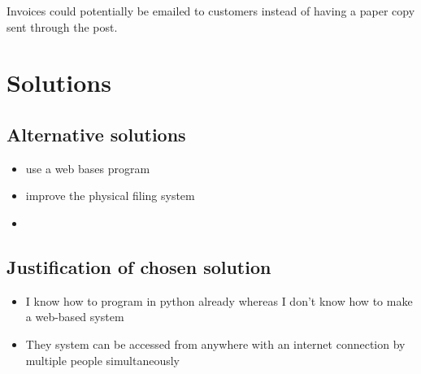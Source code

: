 	Invoices could potentially be emailed to customers instead of having a paper copy sent through the post.
	
	

\section{Solutions}

	\subsection{Alternative solutions}
	\begin{itemize}
	
	\item use a web bases program
	
	\item improve the physical filing system
	
	\item
	\end{itemize}

	\subsection{Justification of chosen solution}
	
	\begin{itemize}
	
	\item I know how to program in python already whereas I don't know how to make a web-based system
	
	\item They system can be accessed from anywhere with an internet connection by multiple people simultaneously

	
	\end{itemize}	 


